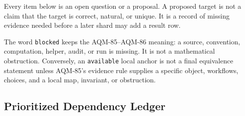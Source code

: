 Every item below is an open question or a proposal.  A proposed target is
not a claim that the target is correct, natural, or unique.  It is a record
of missing evidence needed before a later shard may add a result row.

The word \texttt{blocked} keeps the AQM-85--AQM-86 meaning: a source,
convention, computation, helper, audit, or run is missing.  It is not a
mathematical obstruction.  Conversely, an \texttt{available} local anchor is
not a final equivalence statement unless AQM-85's evidence rule supplies a
specific object, workflows, choices, and a local map, invariant, or
obstruction.

\subsection{Prioritized Dependency Ledger}

